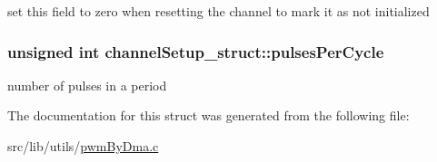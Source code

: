 set this field to zero when resetting the channel to mark it as not initialized 
\subsubsection[{\texorpdfstring{pulses\+Per\+Cycle}{pulsesPerCycle}}]{\setlength{\rightskip}{0pt plus 5cm}unsigned int channel\+Setup\+\_\+struct\+::pulses\+Per\+Cycle}\hypertarget{structchannelSetup__struct_a20356f808e59b5e3a0678493fb71ddef}{}\label{structchannelSetup__struct_a20356f808e59b5e3a0678493fb71ddef}
number of pulses in a period 

The documentation for this struct was generated from the following file\+:\begin{DoxyCompactItemize}
\item 
src/lib/utils/\hyperlink{pwmByDma_8c}{pwm\+By\+Dma.\+c}\end{DoxyCompactItemize}
